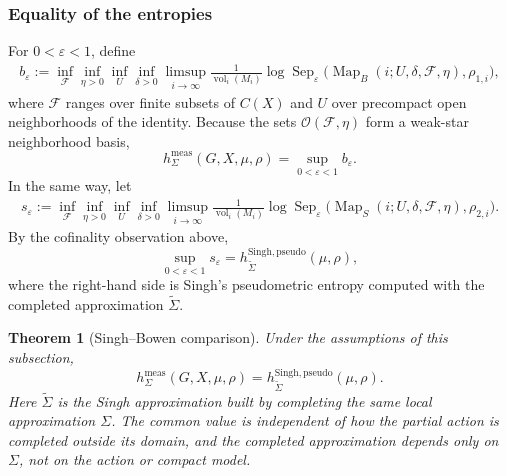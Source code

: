 \documentclass[12pt]{amsart}
\newtheorem{theorem}{Theorem}[section]
\theoremstyle{definition}
\newcommand{\vol}{\operatorname{vol}}
\newcommand{\Map}{\operatorname{Map}}
\newcommand{\Sep}{\operatorname{Sep}}
\newcommand{\cO}{\mathcal O}
\newcommand{\1}{\mathbf 1}
\newcommand{\eps}{\varepsilon}
\begin{document}
\subsubsection{Equality of the entropies}

For $0<\eps<1$, define
\begin{align*}
	b_\eps
	:=\inf_{\mathcal F}\inf_{\eta>0}\inf_U\inf_{\delta>0}
	\limsup_{i\to\infty}\frac{1}{\vol_i(M_i)}
	\log\Sep_\eps
	\bigl(\Map_B(i;U,\delta,\mathcal F,\eta),\rho_{1,i}\bigr),
\end{align*}
where $\mathcal F$ ranges over finite subsets of $C(X)$ and $U$ over precompact
open neighborhoods of the identity. Because the sets
$\cO(\mathcal F,\eta)$ form a weak-star neighborhood basis,
\begin{equation}\label{eq:bowen-b-epsilon}
	h^{\mathrm{meas}}_\Sigma(G,X,\mu,\rho)=\sup_{0<\eps<1} b_\eps.
\end{equation}
In the same way, let
\begin{align*}
	s_\eps
	:=\inf_{\mathcal F}\inf_{\eta>0}\inf_U\inf_{\delta>0}
	\limsup_{i\to\infty}\frac{1}{\vol_i(M_i)}
	\log\Sep_\eps
	\bigl(\Map_S(i;U,\delta,\mathcal F,\eta),\rho_{2,i}\bigr).
\end{align*}
By the cofinality observation above,
\[
\sup_{0<\eps<1}s_\eps
=h_{\widetilde\Sigma}^{\mathrm{Singh,pseudo}}(\mu,\rho),
\]
where the right-hand side is Singh's pseudometric entropy computed with the
completed approximation $\widetilde\Sigma$.

	\begin{theorem}[Singh--Bowen comparison]\label{thm:identification-bowen}
	Under the assumptions of this subsection,
	\begin{equation}\label{eq:main-equivalence}
		h^{\mathrm{meas}}_\Sigma(G,X,\mu,\rho)
		=h_{\widetilde\Sigma}^{\mathrm{Singh,pseudo}}(\mu,\rho).
	\end{equation}
	Here $\widetilde\Sigma$ is the Singh approximation built by completing
	the same local approximation $\Sigma$. The common value is independent of
	how the partial action is completed outside its domain, and the completed
	approximation depends only on $\Sigma$, not on the action or compact model.
\end{theorem}
\end{document}
